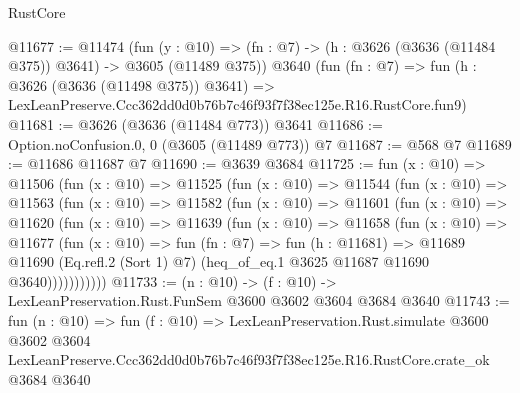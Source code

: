 \begin{lexlean}{RustCore}
\begin{coremodule}
@11677 := @11474
    (fun (y : @10) => (fn : @7) -> (h : @3626 (@3636 (@11484 @375)) @3641) -> @3605 (@11489 @375))
    @3640
    (fun (fn : @7) =>
    fun (h : @3626 (@3636 (@11498 @375)) @3641) =>
    LexLeanPreserve.Ccc362dd0d0b76b7c46f93f7f38ec125e.R16.RustCore.fun9)
@11681 := @3626 (@3636 (@11484 @773)) @3641
@11686 := Option.noConfusion.{0, 0} (@3605 (@11489 @773)) @7
@11687 := @568 @7
@11689 := @11686 @11687 @7
@11690 := @3639 @3684
@11725 := fun (x : @10) =>
  @11506
    (fun (x : @10) =>
    @11525
      (fun (x : @10) =>
      @11544
        (fun (x : @10) =>
        @11563
          (fun (x : @10) =>
          @11582
            (fun (x : @10) =>
            @11601
              (fun (x : @10) =>
              @11620
                (fun (x : @10) =>
                @11639
                  (fun (x : @10) =>
                  @11658
                    (fun (x : @10) =>
                    @11677
                      (fun (x : @10) =>
                      fun (fn : @7) =>
                      fun (h : @11681) =>
                      @11689
                        @11690
                        (Eq.refl.{2} (Sort 1) @7)
                        (heq_of_eq.{1} @3625 @11687 @11690 @3640)))))))))))
@11733 := (n : @10) -> (f : @10) -> LexLeanPreservation.Rust.FunSem @3600 @3602 @3604 @3684 @3640
@11743 := fun (n : @10) =>
  fun (f : @10) =>
  LexLeanPreservation.Rust.simulate
    @3600
    @3602
    @3604
    LexLeanPreserve.Ccc362dd0d0b76b7c46f93f7f38ec125e.R16.RustCore.crate_ok
    @3684
    @3640
\end{coremodule}
\end{lexlean}

